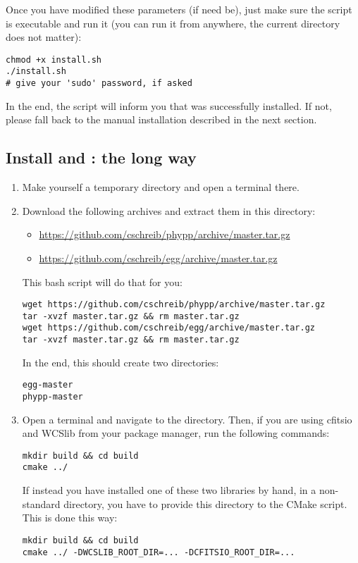 Once you have modified these parameters (if need be), just make sure the script is executable and run it (you can run it from anywhere, the current directory does not matter):
\begin{verbatim}
chmod +x install.sh
./install.sh
# give your 'sudo' password, if asked
\end{verbatim}

In the end, the script will inform you that \egg was successfully installed. If not, please fall back to the manual installation described in the next section.

\subsection{Install \phypp and \egg: the long way}


\begin{enumerate}
\item Make yourself a temporary directory and open a terminal there.
\item Download the following archives and extract them in this directory:
\begin{itemize}
\item \url{https://github.com/cschreib/phypp/archive/master.tar.gz}
\item \url{https://github.com/cschreib/egg/archive/master.tar.gz}
\end{itemize}

This bash script will do that for you:
\begin{verbatim}
wget https://github.com/cschreib/phypp/archive/master.tar.gz
tar -xvzf master.tar.gz && rm master.tar.gz
wget https://github.com/cschreib/egg/archive/master.tar.gz
tar -xvzf master.tar.gz && rm master.tar.gz
\end{verbatim}

In the end, this should create two directories:
\begin{verbatim}
egg-master
phypp-master
\end{verbatim}

\item Open a terminal and navigate to the  directory. Then, if you are using cfitsio and WCSlib from your package manager, run the following commands:
\begin{verbatim}
mkdir build && cd build
cmake ../
\end{verbatim}

If instead you have installed one of these two libraries by hand, in a non-standard directory, you have to provide this directory to the CMake script. This is done this way:
\begin{verbatim}
mkdir build && cd build
cmake ../ -DWCSLIB_ROOT_DIR=... -DCFITSIO_ROOT_DIR=...
\end{verbatim}


\end{enumerate}
